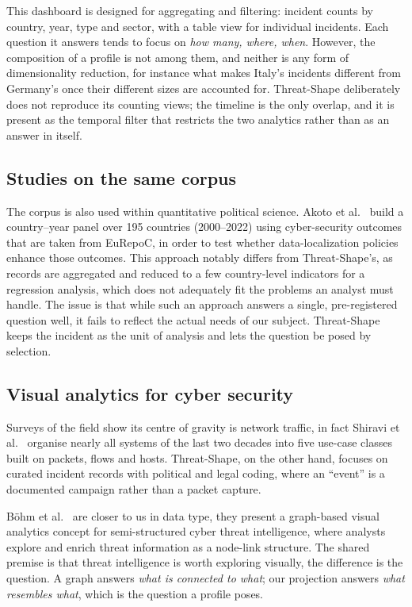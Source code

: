 \documentclass[conference]{IEEEtran}
\begin{document}
This dashboard is designed for aggregating and filtering: incident counts by country, year,
type and sector, with a table view for individual incidents. Each question it answers
tends to focus on \emph{how many, where, when}. However, the composition of a profile is not among them, and neither is any form of dimensionality reduction, for instance what makes
Italy's incidents different from Germany's once their different sizes are accounted for. Threat-Shape
deliberately does not reproduce its counting views; the timeline is the only overlap, and
it is present as the temporal filter that restricts the two analytics rather than as an
answer in itself.

\subsection{Studies on the same corpus}

The corpus is also used within quantitative political science. Akoto et al.~\cite{akoto}
build a country--year panel over 195 countries (2000--2022) using cyber-security outcomes that are taken from EuRepoC, in order to test whether data-localization policies enhance those
outcomes. This approach notably differs from Threat-Shape’s, as records are aggregated and reduced to a few country-level indicators for a regression analysis, which does not adequately fit the problems an analyst must handle. The issue is that while such an approach answers a single, pre-registered question well, it fails to reflect the actual needs of our subject. Threat-Shape keeps the incident as the unit of analysis and lets the question be
posed by selection.

\subsection{Visual analytics for cyber security}

Surveys of the field show its centre of gravity is network traffic, in fact Shiravi et
al.~\cite{shiravi} organise nearly all systems of the last two decades into five use-case
classes built on packets, flows and hosts. Threat-Shape, on the other hand, focuses on curated
incident records with political and legal coding, where an ``event'' is a documented
campaign rather than a packet capture.

Böhm et al.~\cite{bohm} are closer to us in data type, they present a graph-based visual analytics
concept for semi-structured cyber threat intelligence, where analysts explore and enrich
threat information as a node-link structure. The shared premise is that threat
intelligence is worth exploring visually, the difference is the
question. A graph answers \emph{what is connected to what}; our projection answers
\emph{what resembles what}, which is the question a profile poses.
\end{document}
